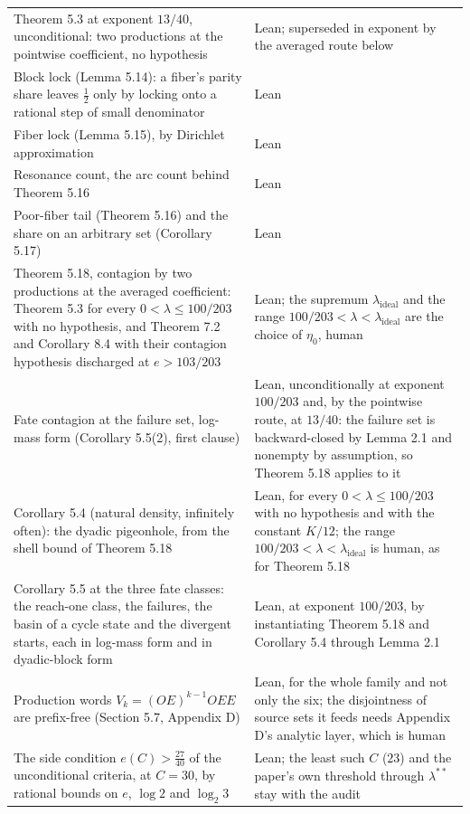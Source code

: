 \documentclass[11pt,a4paper]{article}
\begin{document}
\begin{longtable}[]{@{}
  >{\raggedright\arraybackslash}p{}
  >{\raggedright\arraybackslash}p{}@{}}
Theorem 5.3 at exponent \(13/40\), unconditional: two productions at the
pointwise coefficient, no hypothesis & Lean; superseded in exponent by
the averaged route below \\
Block lock (Lemma 5.14): a fiber's parity share leaves \(\tfrac12\) only
by locking onto a rational step of small denominator & Lean \\
Fiber lock (Lemma 5.15), by Dirichlet approximation & Lean \\
Resonance count, the arc count behind Theorem 5.16 & Lean \\
Poor-fiber tail (Theorem 5.16) and the share on an arbitrary set
(Corollary 5.17) & Lean \\
Theorem 5.18, contagion by two productions at the averaged coefficient:
Theorem 5.3 for every \(0<\lambda\le100/203\) with no hypothesis, and
Theorem 7.2 and Corollary 8.4 with their contagion hypothesis discharged
at \(e>103/203\) & Lean; the supremum \(\lambda_{\mathrm{ideal}}\) and
the range \(100/203<\lambda<\lambda_{\mathrm{ideal}}\) are the choice of
\(\eta_0\), human \\
Fate contagion at the failure set, log-mass form (Corollary 5.5(2),
first clause) & Lean, unconditionally at exponent \(100/203\) and, by
the pointwise route, at \(13/40\): the failure set is backward-closed by
Lemma 2.1 and nonempty by assumption, so Theorem 5.18 applies to it \\
Corollary 5.4 (natural density, infinitely often): the dyadic
pigeonhole, from the shell bound of Theorem 5.18 & Lean, for every
\(0<\lambda\le100/203\) with no hypothesis and with the constant
\(K/12\); the range \(100/203<\lambda<\lambda_{\mathrm{ideal}}\) is
human, as for Theorem 5.18 \\
Corollary 5.5 at the three fate classes: the reach-one class, the
failures, the basin of a cycle state and the divergent starts, each in
log-mass form and in dyadic-block form & Lean, at exponent \(100/203\),
by instantiating Theorem 5.18 and Corollary 5.4 through Lemma 2.1 \\
Production words \(V_k=(OE)^{k-1}OEE\) are prefix-free (Section 5.7,
Appendix D) & Lean, for the whole family and not only the six; the
disjointness of source sets it feeds needs Appendix D's analytic layer,
which is human \\
The side condition \(e(C)>\tfrac{27}{40}\) of the unconditional
criteria, at \(C=30\), by rational bounds on \(e\), \(\log 2\) and
\(\log_2 3\) & Lean; the least such \(C\) (\(23\)) and the paper's own
threshold through \(\lambda^{**}\) stay with the audit \\

\end{longtable}
\end{document}
